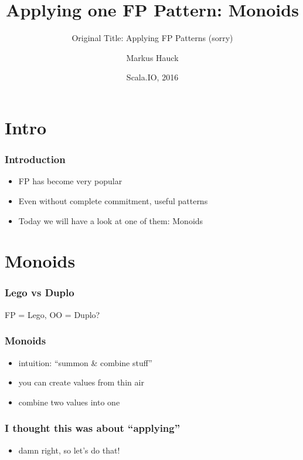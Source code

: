 \documentclass{beamer}
\title{Applying \textbf{one} FP Pattern: Monoids}
\subtitle{Original Title: Applying FP Patterns (sorry)}
\author{Markus Hauck}
\date{Scala.IO, 2016}
\begin{document}
\frame{\titlepage}

\section{Intro}
\label{sec:intro}

\begin{frame}
  \frametitle{Introduction}
  \begin{itemize}
  \item FP has become very popular
  \item Even without complete commitment, useful patterns
  \item Today we will have a look at one of them: Monoids
  \end{itemize}
\end{frame}

\section{Monoids}
\label{sec:monoids}

\begin{frame}
  \frametitle{Lego vs Duplo}
  FP = Lego, OO = Duplo?
\end{frame}

\begin{frame}
  \frametitle{Monoids}
  \begin{itemize}
  \item intuition: ``summon \& combine stuff''
  \item you can create values from thin air
  \item combine two values into one
  \end{itemize}
\end{frame}

\begin{frame}
  \frametitle{I thought this was about ``applying''}
  \begin{itemize}
  \item damn right, so let's do that!
  \end{itemize}
\end{frame}
\end{document}
